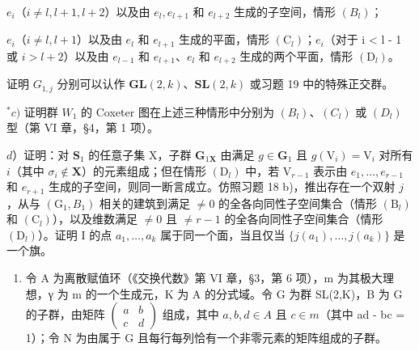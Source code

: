 \(e_i\)（\(i \neq l, l + 1, l + 2\)）以及由 \(e_l, e_{l+1}\) 和 \(e_{l+2}\) 生成的子空间，情形 \((B_l)\)；

\(e_{i}\)（\(i \neq l, l + 1\)）以及由 \(e_{l}\) 和 \(e_{l+1}\) 生成的平面，情形 \((\mathrm{C}_{l})\)；\(e_{i}\)（对于 i \textless{} l - 1 或 \(i > l + 2\)）以及由 \(e_{l-1}\) 和 \(e_{l+1}\)、\(e_{l}\) 和 \(e_{l+2}\) 生成的两个平面，情形 \((\mathrm{D}_{l})\)。 

证明 \(G_{1,j}\) 分别可以认作 \(\mathbf{GL}(2,k)\)、\(\mathbf{SL}(2,k)\) 或习题 19 中的特殊正交群。

\(^{*}c)\) 证明群 \(W_{1}\) 的 Coxeter 图在上述三种情形中分别为 \((B_{l})\)、\((C_{l})\) 或 \((D_{l})\) 型（第 VI 章，§4，第 1 项）。

\(d\)）证明：对 \(\mathbf{S}_1\) 的任意子集 X，子群 \(\mathbf{G}_{1\mathbf{X}}\) 由满足 \(g\in \mathbf{G}_1\) 且 \(g(\mathrm{V}_i) = \mathrm{V}_i\) 对所有 \(i\)（其中 \(\sigma_{i}\notin \mathbf{X}\)）的元素组成；但在情形 \((\mathrm{D}_l)\) 中，若 \(\mathrm{V}_{r - 1}\) 表示由 \(e_1,\dots ,e_{r - 1}\) 和 \(e_{r + 1}\) 生成的子空间，则同一断言成立。仿照习题 18 b)，推出存在一个双射 \(j\)，从与 \((\mathrm{G}_1,B_1)\) 相关的建筑到满足 \(\neq 0\) 的全各向同性子空间集合（情形 \((\mathrm{B}_l)\) 和 \((\mathrm{C}_l)\)），以及维数满足 \(\neq 0\) 且 \(\neq r - 1\) 的全各向同性子空间集合（情形 \((\mathrm{D}_l)\)）。证明 I 的点 \(a_1,\ldots ,a_k\) 属于同一个面，当且仅当 \(\{j(a_1),\dots ,j(a_k)\}\) 是一个旗。

\begin{enumerate}
\def\labelenumi{\arabic{enumi})}
\setcounter{enumi}{20}
\tightlist
\item
  令 A 为离散赋值环（《交换代数》第 VI 章，§3，第 6 项），m 为其极大理想，γ 为 m 的一个生成元，K 为 A 的分式域。令 G 为群 SL(2,K)，B 为 G 的子群，由矩阵 \(\begin{pmatrix} a & b \\ c & d \end{pmatrix}\) 组成，其中 \(a, b, d \in A\) 且 \(c \in m\)（其中 ad - bc = 1）；令 N 为由属于 G 且每行每列恰有一个非零元素的矩阵组成的子群。
\end{enumerate}

